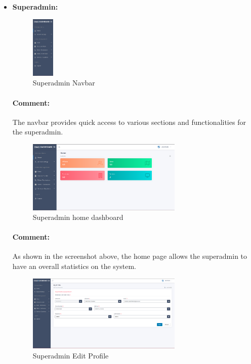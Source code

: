 \begin{itemize}
    \item \textbf{Superadmin:}
\begin{figure}[htbp]
  \centering
  \includegraphics[width=0.1\textwidth]{SCREENSHOTS/superadmin/navbar.png}
  \caption{Superadmin Navbar}
  \label{fig:navbar}
\end{figure}
\paragraph{Comment:} The navbar provides quick access to various sections and functionalities for the superadmin.
\newpage

\begin{figure}[htbp]
    \centering
    \includegraphics[width=0.7\textwidth]{SCREENSHOTS/superadmin/home.png}
    \caption{Superadmin home dashboard}
    \label{fig:home}
  \end{figure}
  \paragraph{Comment:} As shown in the screenshot above, the home page allows the superadmin to have an overall statistics on the system.


\begin{figure}[htbp]
  \centering
  \includegraphics[width=0.7\textwidth]{SCREENSHOTS/superadmin/edit_profile.png}
  \caption{Superadmin Edit Profile}
  \label{fig:edit-profile}
\end{figure}

\end{itemize}
